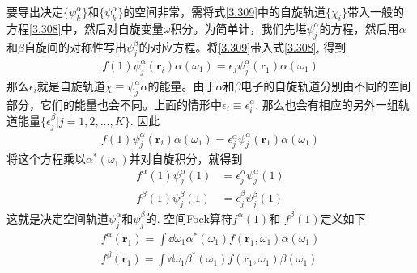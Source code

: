 要导出决定$\{\psi_k^\alpha \}$和$\{\psi_k^\alpha \}$的空间非常，需将式\eqref{3.309}中的自旋轨道$\{\chi_i\}$带入一般的\hft 方程\eqref{3.308}中，然后对自旋变量$\omega$积分。为简单计，我们先堪$\psi_j^\alpha$的方程，然后用$\alpha$和$\beta$自旋间的对称性写出$\psi_j^\beta$的对应方程。将\eqref{3.309}带入式\eqref{3.308}, 得到
\begin{align}
f(1)\psi_j^\alpha(\mathbf{r}_i) \alpha(\omega_1) = \epsilon_j \psi_j^\alpha(\mathbf{r}_1) \alpha(\omega_1)
\end{align}
那么$\epsilon_i$就是自旋轨道$\chi\equiv\psi_j^\alpha\alpha$的能量。由于$\alpha$和$\beta$电子的自旋轨道分别由不同的空间部分，它们的能量也会不同。上面的情形中$\epsilon_i\equiv\epsilon^\alpha_i$. 那么也会有相应的另外一组轨道能量$\{\epsilon_j^\beta | j=1,2,\ldots,K\}$. 因此
\begin{align}
f(1)\psi_j^\alpha(\mathbf{r}_i) \alpha(\omega_1) = \epsilon_j^\alpha \psi_j^\alpha(\mathbf{r}_1) \alpha(\omega_1)
\end{align}
将这个方程乘以$\alpha^*(\omega_1)$并对自旋积分，就得到
\begin{align}
f^\alpha(1)\psi_j^\alpha(1) & = \epsilon_j^\alpha \psi_j^\alpha(1)\\
f^\beta (1)\psi_j^\beta(1)  & = \epsilon_j^\beta \psi_j^\beta(1)
\end{align}
这就是决定空间轨道$\psi_j^\alpha$和$\psi_j^\beta$的. 空间Fock算符$f^\alpha(1)$和 $f^\beta (1)$定义如下
\begin{align}
f^\alpha(\mathbf{r}_1) = \int\dd\omega_1 \alpha^*(\omega_1) f(\mathbf{r}_1,\omega_1)\alpha(\omega_1)\\
f^\beta(\mathbf{r}_1) = \int\dd\omega_1 \beta^*(\omega_1) f(\mathbf{r}_1,\omega_1)\beta(\omega_1)
\end{align}

